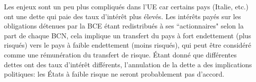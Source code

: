\documentclass[a4paper,11pt]{article}
\begin{document}
Les enjeux sont un peu plus compliqués dans l'UE car certains pays (Italie, etc.) ont une dette qui paie des taux d'intérêt plus élevés. Les intérêts payés sur les obligations détenues par la BCE étant redistribués à ses ``actionnaires" selon la part de chaque BCN, cela implique un transfert du pays à fort endettement (plus risqués) vers le pays à faible endettement (moins risqués), qui peut être considéré comme une rémunération du transfert de risque. Étant donné que différentes dettes ont des taux d'intérêt différents, l'annulation de la dette a des implications politiques: les États à faible risque ne seront probablement pas d'accord.





\end{document}
